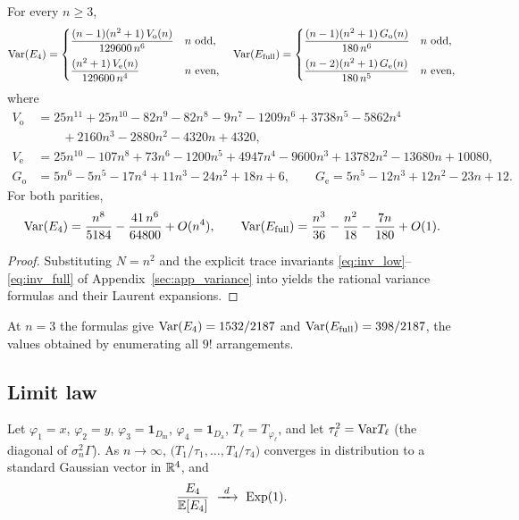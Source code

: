 \begin{theorem}
\label{thm:var_closed}
For every $n\ge3$,
\[
\mathrm{Var}(E_4)=\begin{cases}\dfrac{(n-1)(n^2+1)\,V_{\mathrm o}(n)}{129600\,n^{6}}& n\text{ odd},\\[3mm]
\dfrac{(n^2+1)\,V_{\mathrm e}(n)}{129600\,n^{4}}& n\text{ even},\end{cases}\quad
\mathrm{Var}(E_{\mathrm{full}})=\begin{cases}\dfrac{(n-1)(n^2+1)\,G_{\mathrm o}(n)}{180\,n^{6}}& n\text{ odd},\\[3mm]
\dfrac{(n-2)(n^2+1)\,G_{\mathrm e}(n)}{180\,n^{5}}& n\text{ even},\end{cases}
\]
where
\begin{align*}
V_{\mathrm o}&=25n^{11}+25n^{10}-82n^9-82n^8-9n^7-1209n^6+3738n^5-5862n^4\\&\qquad+2160n^3-2880n^2-4320n+4320,\\
V_{\mathrm e}&=25n^{10}-107n^8+73n^6-1200n^5+4947n^4-9600n^3+13782n^2-13680n+10080,\\
G_{\mathrm o}&=5n^6-5n^5-17n^4+11n^3-24n^2+18n+6,\qquad
G_{\mathrm e}=5n^5-12n^3+12n^2-23n+12 .
\end{align*}
For both parities,
\[
\mathrm{Var}(E_4)=\frac{n^8}{5184}-\frac{41\,n^6}{64800}+O(n^4),\qquad
\mathrm{Var}(E_{\mathrm{full}})=\frac{n^3}{36}-\frac{n^2}{18}-\frac{7n}{180}+O(1).
\]
\end{theorem}

\begin{proof}
Substituting $N=n^2$ and the explicit trace invariants \eqref{eq:inv_low}--\eqref{eq:inv_full} of Appendix~\ref{sec:app_variance} into  yields the rational variance formulas and their Laurent expansions.
\end{proof}


At $n=3$ the formulas give $\mathrm{Var}(E_4)=1532/2187$ and $\mathrm{Var}(E_{\mathrm{full}})=398/2187$, the values obtained by enumerating all $9!$ arrangements.

\subsection{Limit law}

\begin{corollary}
\label{cor:random_energy_clt}
Let $\varphi_1=x$, $\varphi_2=y$, $\varphi_3=\mathbf 1_{D_{\mathrm m}}$, $\varphi_4=\mathbf 1_{D_{\mathrm a}}$, $T_\ell=T_{\varphi_\ell}$, and let $\tau_\ell^2=\mathrm{Var} T_\ell$ (the diagonal of $\sigma_n^2\Gamma$).
As $n\to\infty$, $\bigl(T_1/\tau_1,\dots,T_4/\tau_4\bigr)$ converges in distribution to a standard Gaussian vector in $\mathbb{R}^4$, and
\begin{equation}
\frac{\Efour}{\E[\Efour]}\ \xrightarrow{\ d\ }\ \mathrm{Exp}(1).
\label{eq:low_limit}
\end{equation}
\end{corollary}

